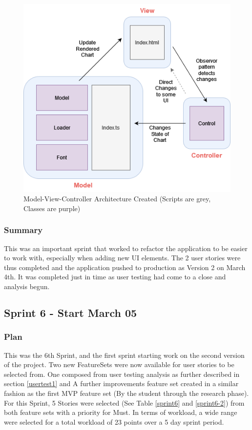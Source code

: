 \begin{figure}[h]
    \centering
    \includegraphics[width=1\columnwidth]{author-files/figures/MVC.png}
    \caption{Model-View-Controller Architecture Created (Scripts are grey, Classes are purple)}
    \label{fig:mvc}
\end{figure}

\subsubsection{Summary}
This was an important sprint that worked to refactor the application to be easier to work with, especially when adding new UI elements.
The 2 user stories were thus completed and the application pushed to production as Version 2 on March 4th.
It was completed just in time as user testing had come to a close and analysis begun.

\subsection{Sprint 6 - Start March 05}
\subsubsection{Plan}
This was the 6th Sprint, and the first sprint starting work on the second version of the project. Two new FeatureSets were now available for user stories to be selected from. One composed from user testing analysis as further described in section \ref{usertest1} and A further improvements feature set created in a similar fashion as the first MVP feature set (By the student through the research phase). For this Sprint, 5 Stories were selected (See Table \ref{sprint6} and \ref{sprint6-2}) from both feature sets with a priority for Must. In terms of workload, a wide range were selected for a total workload of 23 points over a 5 day sprint period.

